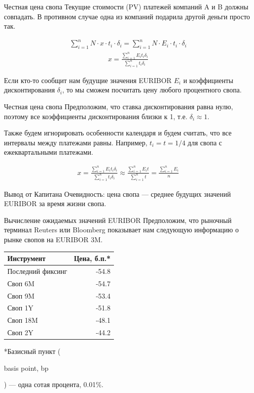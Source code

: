\documentclass{beamer}
\newcommand{\en}[1]{\begin{otherlanguage}{english}#1\end{otherlanguage}}
\begin{document}
\begin{frame}{Честная цена свопа}
\justify
Текущие стоимости (PV) платежей компаний A и B должны совпадать. В противном случае одна из компаний подарила другой деньги просто так.

\justify
\begin{align*}
\sum\limits_{i=1}^{n} N \cdot x \cdot t_i \cdot \delta_i 
= \sum\limits_{i=1}^{n} N \cdot E_i \cdot t_i \cdot \delta_i
\end{align*}
\begin{align*}
x = \frac{\sum\limits_{i=1}^{n} E_i t_i \delta_i}{\sum\limits_{i=1}^{n} t_i \delta_i}
\end{align*}

\justify
Если кто-то сообщит нам будущие значения EURIBOR $E_i$ и коэффициенты дисконтирования $\delta_i$, то мы сможем посчитать цену любого процентного свопа.
\end{frame}



\begin{frame}{Честная цена свопа}
\justify
Предположим, что ставка дисконтирования равна нулю, поэтому все коэффициенты дисконтирования близки к 1, т.е. $\delta_i \approx1$.

\justify
Также будем игнорировать особенности календаря и будем считать, что все интервалы между платежами равны. Например, $t_i = t = 1/4$ для свопа с ежеквартальными платежами.

\begin{align*}
x = \frac{\sum\limits_{i=1}^{n} E_i t_i \delta_i}{\sum\limits_{i=1}^{n} t_i \delta_i}
\approx
\frac{\sum\limits_{i=1}^{n} E_i t}{\sum\limits_{i=1}^{n} t}
=
\frac{\sum\limits_{i=1}^{n} E_i}{n}
\end{align*}

\justify
Вывод от Капитана Очевидность: цена свопа --- среднее будущих значений EURIBOR за время жизни свопа.
\end{frame}



\begin{frame}{Вычисление ожидаемых значений EURIBOR}
\justify
Предположим, что рыночный терминал Reuters или Bloomberg показывает нам следующую информацию о рынке свопов на EURIBOR 3M.

\justify
\centering
\begin{tabular}{l|r}
Инструмент        & Цена, б.п.* \\ \hline
Последний фиксинг & -54.8 \\
Своп 6M           & -54.7 \\
Своп 9M           & -53.4 \\
Своп 1Y           & -51.8 \\
Своп 18M          & -48.1 \\
Своп 2Y           & -44.2
\end{tabular}

\justify
*Базисный пункт (\en{basis point, bp}) --- одна сотая процента, 0.01\%.
\end{frame}
\end{document}
